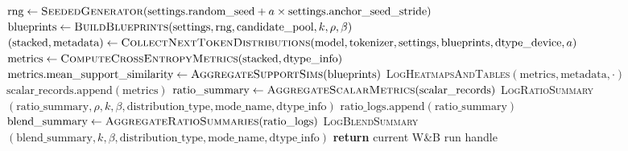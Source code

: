 \documentclass{article}
\begin{document}
\begin{algorithm}
\begin{algorithmic}[1]
                            \STATE $\text{rng} \leftarrow \textsc{SeededGenerator}(\text{settings.random\_seed} + a \times \text{settings.anchor\_seed\_stride})$
                            \STATE $\text{blueprints} \leftarrow \textsc{BuildBlueprints}(\text{settings}, \text{rng}, \text{candidate\_pool}, k, \rho, \beta)$
                            \STATE $(\text{stacked}, \text{metadata}) \leftarrow \textsc{CollectNextTokenDistributions}(\text{model}, \text{tokenizer}, \text{settings}, \text{blueprints}, \text{dtype\_device}, a)$
                            \STATE $\text{metrics} \leftarrow \textsc{ComputeCrossEntropyMetrics}(\text{stacked}, \text{dtype\_info})$
                            \STATE $\text{metrics.mean\_support\_similarity} \leftarrow \textsc{AggregateSupportSims}(\text{blueprints})$
                            \STATE \textsc{LogHeatmapsAndTables}$(\text{metrics}, \text{metadata}, \cdot)$
                            \STATE $\text{scalar\_records.append}(\text{metrics})$
                        \ENDFOR
                        \STATE $\text{ratio\_summary} \leftarrow \textsc{AggregateScalarMetrics}(\text{scalar\_records})$
                        \STATE \textsc{LogRatioSummary}$(\text{ratio\_summary}, \rho, k, \beta, \text{distribution\_type}, \text{mode\_name}, \text{dtype\_info})$
                        \STATE $\text{ratio\_logs.append}(\text{ratio\_summary})$
                    \ENDFOR
                    \STATE $\text{blend\_summary} \leftarrow \textsc{AggregateRatioSummaries}(\text{ratio\_logs})$
                    \STATE \textsc{LogBlendSummary}$(\text{blend\_summary}, k, \beta, \text{distribution\_type}, \text{mode\_name}, \text{dtype\_info})$
                \ENDFOR
            \ENDFOR
        \ENDFOR
    \ENDFOR
\ENDFOR
\STATE \textbf{return} current W\&B run handle
\end{algorithmic}
\end{algorithm}
\end{document}
